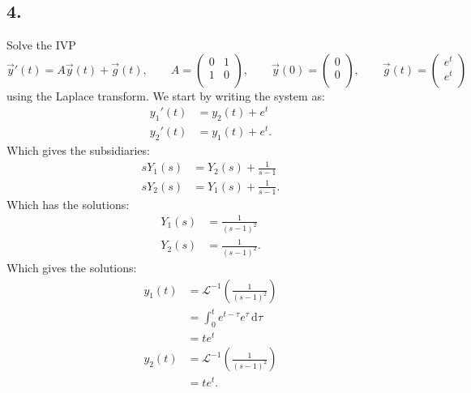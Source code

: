 \subsection*{4.} Solve the IVP
\[ 
\Vec{y}'(t) = A \Vec{y}(t) + \Vec{g}(t), \qquad A = \begin{pmatrix}
0 & 1\\
1 & 0\\
\end{pmatrix}, \qquad \Vec{y}(0) = \begin{pmatrix}
0\\
0\\
\end{pmatrix}, \qquad \Vec{g}(t) = \begin{pmatrix}
e^{t}\\
e^{t}\\
\end{pmatrix}
\]
using the Laplace transform.
\bigbreak
We start by writing the system as:
\begin{align*}
  y_1'(t) &= y_2(t) + e^{t} \\
  y_2'(t) &= y_1(t) + e^{t}
.\end{align*}
Which gives the subsidiaries:
\begin{align*}
  s Y_1(s) &= Y_2(s) + \frac{1}{s-1} \\
  s Y_2(s) &= Y_1(s) + \frac{1}{s-1}
.\end{align*}
Which has the solutions:
\begin{align*}
  Y_1(s) &= \frac{1}{\left( s-1 \right)^2} \\
  Y_2(s) &= \frac{1}{\left( s-1 \right)^2}
.\end{align*}
Which gives the solutions:
\begin{align*}
  y_1(t) &= \mathcal{L}^{-1} \left( \frac{1}{\left( s-1 \right)^2} \right)  \\
  &= \int_{0}^{t} e^{t - \tau} e^{\tau} \, \mathrm{d}\tau \\
  &= te^{t} \\
  y_2(t) &= \mathcal{L}^{-1}\left( \frac{1}{\left( s-1 \right)^2} \right) \\
         &= te^{t}
.\end{align*}
